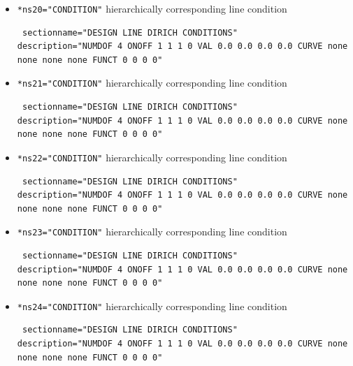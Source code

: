 \begin{itemize}
 \item \verb|*ns20="CONDITION"| \qquad hierarchically corresponding line condition
\begin{small} \begin{verbatim} sectionname="DESIGN LINE DIRICH CONDITIONS"
description="NUMDOF 4 ONOFF 1 1 1 0 VAL 0.0 0.0 0.0 0.0 CURVE none none none none FUNCT 0 0 0 0"
\end{verbatim} \end{small}

 \item \verb|*ns21="CONDITION"| \qquad hierarchically corresponding line condition
\begin{small} \begin{verbatim} sectionname="DESIGN LINE DIRICH CONDITIONS"
description="NUMDOF 4 ONOFF 1 1 1 0 VAL 0.0 0.0 0.0 0.0 CURVE none none none none FUNCT 0 0 0 0"
\end{verbatim} \end{small}

 \item \verb|*ns22="CONDITION"| \qquad hierarchically corresponding line condition
\begin{small} \begin{verbatim} sectionname="DESIGN LINE DIRICH CONDITIONS"
description="NUMDOF 4 ONOFF 1 1 1 0 VAL 0.0 0.0 0.0 0.0 CURVE none none none none FUNCT 0 0 0 0"
\end{verbatim} \end{small} 

\item \verb|*ns23="CONDITION"| \qquad hierarchically corresponding line condition
\begin{small} \begin{verbatim} sectionname="DESIGN LINE DIRICH CONDITIONS"
description="NUMDOF 4 ONOFF 1 1 1 0 VAL 0.0 0.0 0.0 0.0 CURVE none none none none FUNCT 0 0 0 0"
\end{verbatim} \end{small}

 \item \verb|*ns24="CONDITION"| \qquad hierarchically corresponding line condition
\begin{small} \begin{verbatim} sectionname="DESIGN LINE DIRICH CONDITIONS"
description="NUMDOF 4 ONOFF 1 1 1 0 VAL 0.0 0.0 0.0 0.0 CURVE none none none none FUNCT 0 0 0 0"
\end{verbatim} \end{small} 


\end{itemize}
